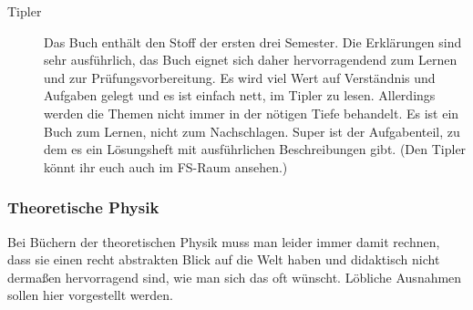 \begin{description}

\item[Tipler]{
		Das Buch enthält den Stoff der ersten drei Semester. Die Erklärungen sind sehr ausführlich, das Buch eignet sich daher hervorragendend zum Lernen und zur Prüfungsvorbereitung. Es wird viel Wert auf Verständnis und Aufgaben gelegt und es ist einfach nett, im Tipler zu lesen. Allerdings werden die Themen nicht immer in der nötigen Tiefe behandelt. Es ist ein Buch zum Lernen, nicht zum Nachschlagen. Super ist der Aufgabenteil, zu dem es ein Lösungsheft mit ausführlichen Beschreibungen gibt. (Den Tipler könnt ihr euch auch im FS-Raum ansehen.)}

\end{description}

\subsubsection*{Theoretische Physik}

Bei Büchern der theoretischen Physik muss man leider immer damit rechnen, dass sie einen recht abstrakten Blick auf die Welt haben und didaktisch nicht dermaßen hervorragend sind, wie man sich das oft wünscht. Löbliche Ausnahmen sollen hier vorgestellt werden.

